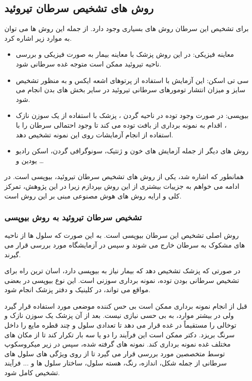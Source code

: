 \subsection{روش های تشخیص سرطان تیروئید}\label{subsec:روش-های-تشخیص-سرطان-تیروئید}

برای تشخیص این سرطان روش های بسیاری وجود دارد.
از جمله این روش ها می توان به موارد زیر اشاره کرد.

\begin{itemize}
    \item معاینه فیزیکی:
    در این روش پزشک با معاینه بیمار به صورت فیزیکی و بررسی ناحیه تیروئید ممکن است متوجه غده سرطانی شود.
    \item سی تی اسکن:
    این آزمایش با استفاده از پرتوهای اشعه ایکس و به منظور تشخیص سایز و میزان انتشار تومورهای سرطانی تیروئید در سایر بخش های بدن انجام می شود.
    \item بیوپسی:
    در صورت وجود توده در ناحیه گردن ، پزشک با استفاده از يک سوزن نازک ، اقدام به نمونه برداری از بافت توده می کند تا وجود احتمالی سرطان را با استفاده از انجام آزمایشات روی این نمونه تشخیص دهد.
    \item روش های دیگر از جمله آزمایش های خون و ژنتیک، سونوگرافی گردن، اسکن رادیو یودین و \ldots
\end{itemize}

همانطور که اشاره شد، یکی از روش های تشخیص سرطان تیروئید، بیوپسی است.
در ادامه می خواهم به جزییات بیشتری از این روش بپردازم زیرا در این پژوهش، تمرکز کلی و ارایه روش های هوش مصنوعی مبنی بر این روش است.

\subsubsection{تشخیص سرطان تیروئید به روش بیوپسی}
روش اصلی تشخیص این سرطان بیوپسی است.
به این صورت که سلول ها از ناحیه های مشکوک به سرطان خارج می شوند و سپس در آزمایشگاه مورد بررسی قرار می گیرند.

در صورتی که پزشک تشخیص دهد که بیمار نیاز به بیوپسی دارد، اسان ترین راه برای تشخیص سرطانی بودن توده،
نمونه برداری سوزنی است.
این نوع بیوپسی در بعضی مواقع می تواند، در کلینیک و دفتر پزشک انجام شود.

قبل از انجام نمونه برداری ممکن است بی حس کننده موضعی مورد استفاده قرار گیرد ولی در بیشتر موارد، به بی حسی نیازی نیست.
بعد از آن پزشک یک سوزن نازک و توخالی را مستقیماً در غده قرار می دهد تا تعدادی سلول و چند قطره مایع را داخل سرنگ بریزد.
دکتر ممکن است این فرآیند را دو یا سه بار تکرار کند تا از مکان های مختلف غده نمونه برداری کند.
نمونه های گرفته شده، سپس در زیر میکروسکوپ توسط متخصصین مورد بررسی قرار می گیرد تا از روی ویژگی های سلول های سرطانی از جمله شکل، اندازه، رنگ، هسته سلول، ساختار سلول ها و ... فرآیند تشخیص کامل شود.


